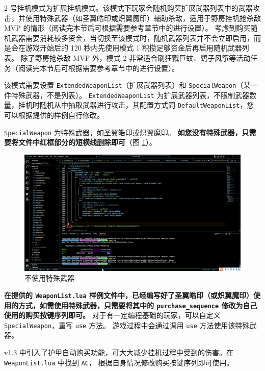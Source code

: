 2 号挂机模式为扩展挂机模式。该模式下玩家会随机购买扩展武器列表中的武器攻击，并使用特殊武器（如圣翼皓印或炽翼魔印）辅助杀敌，适用于野房挂机抢杀敌 MVP 的情形（阅读完本节后可根据需要参考章节中的进行设置）。
考虑到购买随机武器需要消耗较多资金，当切换至该模式时，随机武器列表并不会立即启用，而是会在游戏开始后的 120 秒内先使用模式 1 积攒足够资金后再启用随机武器列表。
除了野房抢杀敌 MVP 外，模式 2 非常适合刷狂戮巨蚊、鹞子风筝等活动任务（阅读完本节后可根据需要参考章节中的进行设置）。

该模式需要设置 \lstinline{ExtendedWeaponList}（扩展武器列表）和 \lstinline{SpecialWeapon}（某一件特殊武器，不是列表）。
\lstinline{ExtendedWeaponList} 为扩展武器列表，不限制武器数量，挂机时随机从中抽取武器进行攻击，其配置方式同 \lstinline{DefaultWeaponList}，您可以根据提供的样例自行修改。

\lstinline{SpecialWeapon} 为特殊武器，如圣翼皓印或炽翼魔印。\textbf{\color{red} 如您没有特殊武器，只需要将文件中红框部分的短横线删除即可}（图 \ref{ch2fig-delete-special-weapon}）。

\begin{figure}
    \Centering
    \includegraphics[width=\textwidth]{docs/assets/delete_SpecialWeapon.png}
    \caption{不使用特殊武器}
    \label{ch2fig-delete-special-weapon}
\end{figure}

\textbf{\color{red} 在提供的 \lstinline{WeaponList.lua} 样例文件中，已经编写好了圣翼皓印（或炽翼魔印）使用的方式，如需使用特殊武器，只需要将其中的 \lstinline{purchase_sequence} 修改为自己使用的购买按键序列即可。}
对于有一定编程基础的玩家，可以自定义 \lstinline{SpecialWeapon}，重写 \lstinline{use} 方法。
游戏过程中会通过调用 \lstinline{use} 方法使用该特殊武器。

v1.3 中引入了护甲自动购买功能，可大大减少挂机过程中受到的伤害。在 \lstinline{WeaponList.lua} 中找到 \lstinline{AC}， 根据自身情况修改购买按键序列即可使用。

